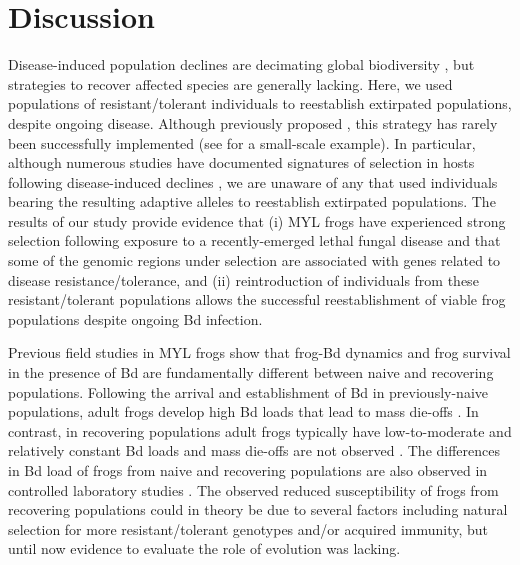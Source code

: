\documentclass[9pt,twocolumn,twoside,lineno]{pnas-new}
\begin{document}
\section*{Discussion}

Disease-induced population declines are decimating global biodiversity
\citep{daszak2000}, but strategies to recover affected species are
generally lacking. Here, we used populations of resistant/tolerant
individuals to reestablish extirpated populations, despite ongoing
disease. Although previously proposed \citep{mendelson2019}, this
strategy has rarely been successfully implemented (see
\citep{joseph2018} for a small-scale example). In particular, although
numerous studies have documented signatures of selection in hosts
following disease-induced declines
\citep[e.g.,][]{epstein2016, gignoux-wolfsohn2021}, we are unaware of
any that used individuals bearing the resulting adaptive alleles to
reestablish extirpated populations. The results of our study provide
evidence that (i) MYL frogs have experienced strong selection following
exposure to a recently-emerged lethal fungal disease and that some of
the genomic regions under selection are associated with genes related to
disease resistance/tolerance, and (ii) reintroduction of individuals
from these resistant/tolerant populations allows the successful
reestablishment of viable frog populations despite ongoing Bd infection.

Previous field studies in MYL frogs show that frog-Bd dynamics and frog
survival in the presence of Bd are fundamentally different between naive
and recovering populations. Following the arrival and establishment of
Bd in previously-naive populations, adult frogs develop high Bd loads
that lead to mass die-offs \citep{vredenburg2010}. In contrast, in
recovering populations adult frogs typically have low-to-moderate and
relatively constant Bd loads and mass die-offs are not observed
\citep[see also Figure S5 - before
translocation]{briggs2010, knapp2011}. The differences in Bd load of
frogs from naive and recovering populations are also observed in
controlled laboratory studies \citep[Figure 4]{knapp2016}. The observed
reduced susceptibility of frogs from recovering populations could in
theory be due to several factors including natural selection for more
resistant/tolerant genotypes and/or acquired immunity, but until now
evidence to evaluate the role of evolution was lacking.
\end{document}
